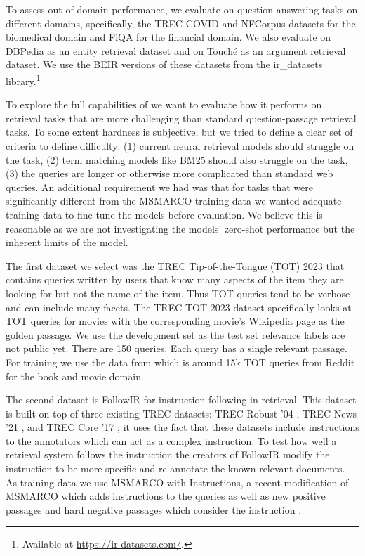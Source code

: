 \documentclass[sigconf,]{acmart}
\begin{document}
To assess out-of-domain performance, we evaluate on question answering tasks on different domains, specifically, the TREC COVID \cite{TREC-Covid} and NFCorpus datasets \cite{NFCorpus} for the biomedical domain and FiQA \cite{FiQA} for the financial domain. We also evaluate on DBPedia \cite{DBpedia} as an entity retrieval dataset and on Touch\'{e} \cite{Touche} as an argument retrieval dataset. We use the BEIR \cite{BEIR} versions of these datasets from the ir\_datasets library.\footnote{Available at \url{https://ir-datasets.com/}.}

To explore the full capabilities of \name{} we want to evaluate how it performs on retrieval tasks that are more challenging than standard question-passage retrieval tasks. To some extent hardness is subjective, but we tried to define a clear set of criteria to define difficulty: (1) current neural retrieval models should struggle on the task, (2) term matching models like BM25 should also struggle on the task, (3) the queries are longer or otherwise more complicated than standard web queries. An additional requirement we had was that for tasks that were significantly different from the MSMARCO training data we wanted adequate training data to fine-tune the models before evaluation. We believe this is reasonable as we are not investigating the models' zero-shot performance but the inherent limits of the model.

The first dataset we select was the TREC Tip-of-the-Tongue (TOT) 2023 \cite{TREC-TOT-2023} that contains queries written by users that know many aspects of the item they are looking for but not the name of the item. Thus TOT queries tend to be verbose and can include many facets. The TREC TOT 2023 dataset specifically looks at TOT queries for movies with the corresponding movie's Wikipedia page as the golden passage. We use the development set as the test set relevance labels are not public yet. There are 150 queries. Each query has a single relevant passage. For training we use the data from  \citet{TOMT-TrainingDataset} which is around 15k TOT queries from Reddit for the book and movie domain.

The second dataset is FollowIR \cite{FollowIR} for instruction following in retrieval. This dataset is built on top of three existing TREC datasets: TREC Robust '04 \cite{Robust04}, TREC News '21 \cite{TREC-News20}, and TREC Core '17 \cite{TREC-Core17}; it uses the fact that these datasets include instructions to the annotators which can act as a complex instruction. To test how well a retrieval system follows the instruction the creators of FollowIR modify the instruction to be more specific and re-annotate the known relevant documents. %
As training data we use MSMARCO with Instructions, a recent modification of MSMARCO which adds instructions to the queries as well as new positive passages and hard negative passages which consider the instruction \cite{MSMARCO-with-Instructions}.
\end{document}
